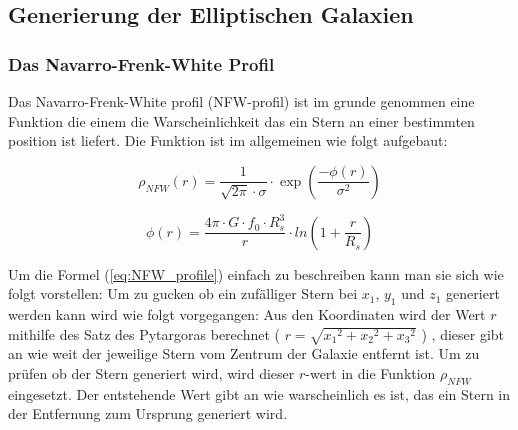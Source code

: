 
%
%
%
%
%


\subsection{Generierung der Elliptischen Galaxien}
\subsubsection{Das Navarro-Frenk-White Profil}

Das Navarro-Frenk-White profil (NFW-profil) ist im grunde genommen eine Funktion
die einem die Warscheinlichkeit das ein Stern an einer bestimmten position ist
liefert.
Die Funktion ist im allgemeinen wie folgt aufgebaut:

\begin{equation} \label{eq:NFW_profile}
  \rho_{NFW}(r) = \frac{ 1 }{ \sqrt{ 2 \pi } \cdot \sigma } \cdot
  \exp \left( \frac{ -\phi(r) }{ \sigma^{ 2 } } \right)
\end{equation}

\begin{equation*}
  \phi(r) = \frac{ 4\pi \cdot G \cdot f_{0} \cdot R_{s}^3 }{ r } \cdot
  ln{ \left( 1 + \frac{ r }{ R_{s} } \right) }
\end{equation*}

Um die Formel (\ref{eq:NFW_profile}) einfach zu beschreiben kann man sie sich
wie folgt vorstellen:
Um zu gucken ob ein zufälliger Stern
bei \( x_1 \), \( y_1 \) und \( z_1 \) generiert werden kann wird wie folgt
vorgegangen: Aus den Koordinaten wird der Wert \( r \) mithilfe des Satz des
Pytargoras berechnet ( \( r = \sqrt{{x_1}^2 + {x_2}^2 + {x_3}^2} \) ) , dieser gibt
an wie weit der jeweilige Stern vom Zentrum der Galaxie entfernt ist. Um zu
prüfen ob der Stern generiert wird, wird dieser \( r \)-wert in die Funktion
\( \rho_{NFW} \) eingesetzt. Der entstehende Wert gibt an wie warscheinlich es ist,
das ein Stern in der Entfernung zum Ursprung generiert wird.


